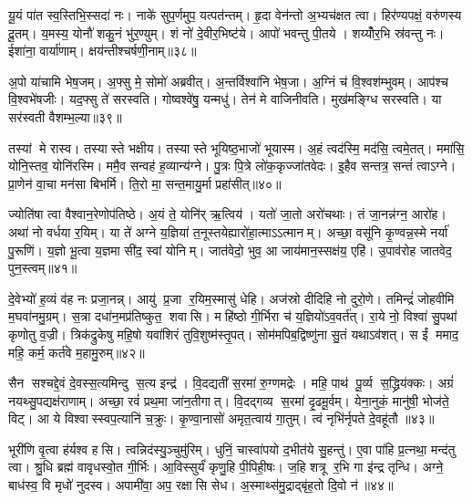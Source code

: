 यू॒यं पा॑त स्व॒स्तिभि॒स्सदा॑ नः। नाके॑ सुप॒र्णमुप॒ यत्पत॑न्तम्। हृ॒दा वेन॑न्तो अ॒भ्यच॑क्षत त्वा। हिर॑ण्यपक्षं॒ वरु॑णस्य दू॒तम्। य॒मस्य॒ योनौ॑ शकु॒नं भु॑र॒ण्युम्। शं नो॑ दे॒वीर॒भिष्ट॑ये। आपो॑ भवन्तु पी॒तये। शय्योँर॒भि स्र॑वन्तु नः। ईशा॑ना॒ वार्या॑णाम्। क्षय॑न्तीश्चर्\mbox{}षणी॒नाम्॥३८॥

अ॒पो या॑चामि भेष॒जम्। अ॒फ्सु मे॒ सोमो॑ अब्रवीत्। अ॒न्तर्विश्वा॑नि भेष॒जा। अ॒ग्निं च॑ वि॒श्वश॑म्भुवम्। आप॑श्च वि॒श्वभे॑षजीः। यद॒फ्सु ते॑ सरस्वति। गोष्वश्वे॑षु॒ यन्मधु॑। तेन॑ मे वाजिनीवति। मुख॑मङ्ग्धि सरस्वति। या सर॑स्वती वैशम्भ॒ल्या॥३९॥

तस्यां मे रास्व। तस्यास्ते भक्षीय। तस्यास्ते भूयिष्ठ॒भाजो॑ भूयास्म। अ॒हं त्वद॑स्मि॒ मद॑सि॒ त्वमे॒तत्। ममा॑सि॒ योनि॒स्तव॒ योनि॑रस्मि। ममै॒व सन्वह॑ ह॒व्यान्य॑ग्ने। पु॒त्रः पि॒त्रे लो॑क॒कृज्जा॑तवेदः। इ॒हैव सन्तत्र॒ सन्तं॑ त्वाऽग्ने। प्रा॒णेन॑ वा॒चा मन॑सा बिभर्मि। ति॒रो मा॒ सन्त॒मायु॒र्मा प्रहा॑सीत्॥४०॥

ज्योति॑षा त्वा वैश्वान॒रेणोप॑तिष्ठे। अ॒यं ते॒ योनि॑र् ऋ॒त्विय॑। यतो॑ जा॒तो अरो॑चथाः। तं जा॒नन्न॑ग्न॒ आरो॑ह। अथा॑ नो वर्धया र॒यिम्। या ते॑ अग्ने य॒ज्ञिया॑ त॒नूस्तयेह्यारो॑हा॒त्माऽऽत्मानम्। अच्छा॒ वसू॑नि कृ॒ण्वन्न॒स्मे नर्या॑ पु॒रूणि॑। य॒ज्ञो भू॒त्वा य॒ज्ञमा सी॑द॒ स्वां योनिम्। जात॑वेदो॒ भुव॒ आ जाय॑मान॒स्सक्ष॑य॒ एहि॑। उ॒पाव॑रोह जातवेद॒ पुन॒स्त्वम्॥४१॥

दे॒वेभ्यो॑ ह॒व्यं व॑ह नः प्रजा॒नन्न्। आयु॑ प्र॒जा र॒यिम॒स्मासु॑ धेहि। अज॑स्रो दीदिहि नो दुरो॒णे। तमिन्द्रं॑ जोहवीमि म॒घवा॑नमु॒ग्रम्। स॒त्रा दधा॑न॒मप्र॑तिष्कुत॒ शवासि। महि॑ष्ठो गी॒र्भिरा च॑ य॒ज्ञियो॑ऽव॒वर्त॑त्। रा॒ये नो॒ विश्वा॑ सु॒पथा॑ कृणोतु व॒ज्री। त्रिक॑द्रुकेषु महि॒षो यवा॑शिरं तुवि॒शुष्म॑स्तृ॒पत्। सोम॑मपिब॒द्विष्णु॑ना सु॒तं यथाऽव॑शत्। स ईं ममाद॒ महि॒ कर्म॒ कर्त॑वे म॒हामु॒रुम्॥४२॥

सैन सश्चद्दे॒वं दे॒वस्स॒त्यमिन्दु स॒त्य इन्द्र॑। वि॒दद्यती॑ स॒रमा॑ रु॒ग्णमद्रेः। महि॒ पाथ॑ पू॒र्व्य स॒द्ध्रिय॑क्कः। अग्रं॑ नयथ्सु॒पद्यक्ष॑राणाम्। अच्छा॒ रवं॑ प्रथ॒मा जा॑न॒तीगात्। वि॒दद्गव्य स॒रमा॑ दृ॒ढमू॒र्वम्। येना॒नुकं॒ मानु॑षी॒ भोज॑ते॒ विट्। आ ये विश्वास्स्वप॒त्यानि॑ च॒क्रुः। कृ॒ण्वा॒नासो॑ अमृत॒त्वाय॑ गा॒तुम्। त्वं नृभि॑र्नृपते दे॒वहू॑तौ ॥४३॥

भूरी॑णि वृ॒त्वा ह॑र्यश्व हसि। त्वन्निद॑स्यु॒ञ्चुमु॑रिम्। धुनिं॒ चास्वा॑पयो द॒भीत॑ये सु॒हन्तु॑। ए॒वा पा॑हि प्र॒त्नथा॒ मन्द॑तु त्वा। श्रु॒धि ब्रह्म॑ वावृधस्वो॒त गी॒र्भिः। आ॒विस्सुर्यं॑ कृणु॒हि पी॒पिही॒षः। ज॒हि शत्रू र॒भि गा इ॑न्द्र तृन्धि। अग्ने॒ बाध॑स्व॒ वि मृधो॑ नुदस्व। अपामी॑वा॒ अप॒ रक्षासि सेध। अ॒स्माथ्स॑मु॒द्राद्बृ॑ह॒तो दि॒वो न॑॥४४॥

